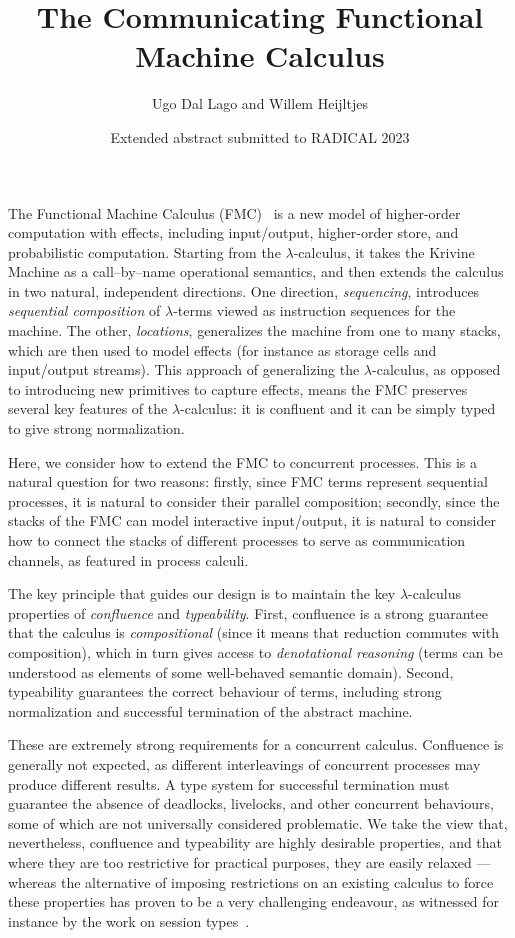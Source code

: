 \documentclass{article}
\title{The Communicating Functional Machine Calculus}
\author{Ugo Dal Lago and Willem Heijltjes}
\date{Extended abstract submitted to RADICAL 2023}
\theoremstyle{definition}
\theoremstyle{plain}
\begin{document}
\maketitle



The Functional Machine Calculus (FMC)~\cite{Heijltjes-2023} is a new model of higher-order computation with effects, including input/output, higher-order store, and probabilistic computation. Starting from the $\lambda$-calculus, it takes the Krivine Machine as a call--by--name operational semantics, and then extends the calculus in two natural, independent directions. One direction, \emph{sequencing}, introduces \emph{sequential composition} of $\lambda$-terms viewed as instruction sequences for the machine. The other, \emph{locations}, generalizes the machine from one to many stacks, which are then used to model effects (for instance as storage cells and input/output streams). This approach of generalizing the $\lambda$-calculus, as opposed to introducing new primitives to capture effects, means the FMC preserves several key features of the $\lambda$-calculus: it is confluent and it can be simply typed to give strong normalization.

Here, we consider how to extend the FMC to concurrent processes. This is a natural question for two reasons: firstly, since FMC terms represent sequential processes, it is natural to consider their parallel composition; secondly, since the stacks of the FMC can model interactive input/output, it is natural to consider how to connect the stacks of different processes to serve as communication channels, as featured in process calculi.

The key principle that guides our design is to maintain the key $\lambda$-calculus properties of \emph{confluence} and \emph{typeability}. First, confluence is a strong guarantee that the calculus is \emph{compositional} (since it means that reduction commutes with composition), which in turn gives access to \emph{denotational reasoning} (terms can be understood as elements of some well-behaved semantic domain). Second, typeability guarantees the correct behaviour of terms, including strong normalization and successful termination of the abstract machine.

These are extremely strong requirements for a concurrent calculus. Confluence is generally not expected, as  different interleavings of concurrent processes may produce different results. A type system for successful termination must guarantee the absence of deadlocks, livelocks, and other concurrent behaviours, some of which are not universally considered problematic. We take the view that, nevertheless, confluence and typeability are highly desirable properties, and that where they are too restrictive for practical purposes, they are easily relaxed --- whereas the alternative of imposing restrictions on an existing calculus to force these properties has proven to be a very challenging endeavour, as witnessed for instance by the work on session types~\cite{Honda-1993,Caires-Pfenning-2010}.
\end{document}
